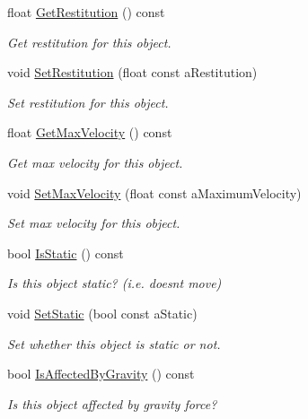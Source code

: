 \begin{DoxyCompactItemize}
float \hyperlink{classPhysicsObject_a5f61945008b6ec0d80faef109aefdde6}{Get\+Restitution} () const 
\begin{DoxyCompactList}\small\item\em Get restitution for this object. \end{DoxyCompactList}\item 
void \hyperlink{classPhysicsObject_a5ab4b3ea8cca7bdaf1d92a4e04b67d49}{Set\+Restitution} (float const a\+Restitution)
\begin{DoxyCompactList}\small\item\em Set restitution for this object. \end{DoxyCompactList}\item 
float \hyperlink{classPhysicsObject_ab6e2523846b8e97fc85767de23cc7987}{Get\+Max\+Velocity} () const 
\begin{DoxyCompactList}\small\item\em Get max velocity for this object. \end{DoxyCompactList}\item 
void \hyperlink{classPhysicsObject_a7b68828e71de3b13ef2bf874debdc468}{Set\+Max\+Velocity} (float const a\+Maximum\+Velocity)
\begin{DoxyCompactList}\small\item\em Set max velocity for this object. \end{DoxyCompactList}\item 
bool \hyperlink{classPhysicsObject_a216dd134b23e61f76cc0253e35e49427}{Is\+Static} () const 
\begin{DoxyCompactList}\small\item\em Is this object static? (i.\+e. doesn\textquotesingle{}t move) \end{DoxyCompactList}\item 
void \hyperlink{classPhysicsObject_a2499ecef8cde9cce4a2a501e8585b339}{Set\+Static} (bool const a\+Static)
\begin{DoxyCompactList}\small\item\em Set whether this object is static or not. \end{DoxyCompactList}\item 
bool \hyperlink{classPhysicsObject_a1d6e4007ed301df275d912bee9889df4}{Is\+Affected\+By\+Gravity} () const 
\begin{DoxyCompactList}\small\item\em Is this object affected by gravity force? \end{DoxyCompactList}\item 

\end{DoxyCompactItemize}
